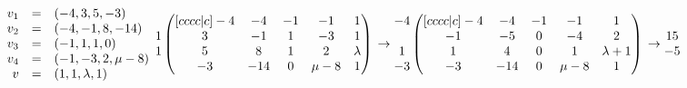 \documentclass{article}
\begin{document}
    \begin{math}
        \begin{array}{rcl}
            v_1 & = & (-4, 3, 5, -3)\\
            v_2 & = & (-4, -1, 8, -14)\\
            v_3 & = & (-1, 1, 1, 0)\\
            v_4 & = & (-1, -3, 2,\mu - 8)\\
            v & = & (1, 1, \lambda, 1)
        \end{array}\\
        \\
        \\
        \begin{matrix}
          ~\\
          1\\
          1\\
          ~
        \end{matrix}
        \begin{pmatrix}[cccc|c]
             -4 & -4 & -1 & -1 & 1\\
             3 & -1 & 1 & -3 & 1\\
             5 & 8 & 1 & 2 & \lambda\\
             -3 & -14 & 0 & \mu - 8 & 1
        \end{pmatrix}\\
        \\
        \\
        \to
        \begin{matrix}
          -4\\
          ~\\
          1\\
          -3
        \end{matrix}
        \begin{pmatrix}[cccc|c]
             -4 & -4 & -1 & -1 & 1\\
             -1 & -5 & 0 & -4 & 2\\
             1 & 4 & 0 & 1 & \lambda + 1\\
             -3 & -14 & 0 & \mu - 8 & 1
        \end{pmatrix}
        \\
        \\
        \\
        \to
        \begin{matrix}
          15\\
          -5\\

\end{matrix}
\end{math}
\end{document}
